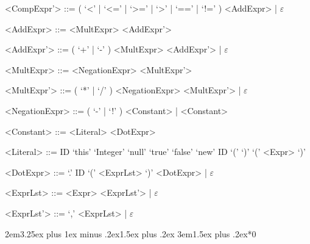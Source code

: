 \documentclass{report}
\begin{document}
\begin{grammar}
<CompExpr'> ::= ( `<' | `<=' | `>=' | `>' | `==' | `!=' ) <AddExpr> | $\varepsilon$

<AddExpr> ::= <MultExpr> <AddExpr'>

<AddExpr'> ::= ( `+' | `-' ) <MultExpr> <AddExpr'> | $\varepsilon$

<MultExpr> ::= <NegationExpr> <MultExpr'>

<MultExpr'> ::= ( `*' | `/' ) <NegationExpr> <MultExpr'> | $\varepsilon$

<NegationExpr> ::= ( `-' | `!' ) <Constant> | <Constant>

<Constant> ::= <Literal> <DotExpr>

<Literal> ::= ID
\alt `this'
\alt `Integer'
\alt `null'
\alt `true'
\alt `false'
\alt `new' ID `(' `)'
\alt `(' <Expr> `)'

<DotExpr> ::= `.' ID `(' <ExprLst> `)' <DotExpr> | $\varepsilon$

<ExprLst> ::= <Expr> <ExprLst'> | $\varepsilon$

<ExprLst'> ::= `,' <ExprLst> | $\varepsilon$

\end{grammar}


\titleformat{\subsection}[block]{}{\thesubsection}{1em}{}
\titleformat{\subsubsection}[block]{}{\thesubsubsection}{1em}{}
\titlespacing*{\subsection} {2em}{3.25ex plus 1ex minus .2ex}{1.5ex plus .2ex}
\titlespacing*{\subsubsection} {3em}{1.5ex plus .2ex}{*0}

\end{document}
